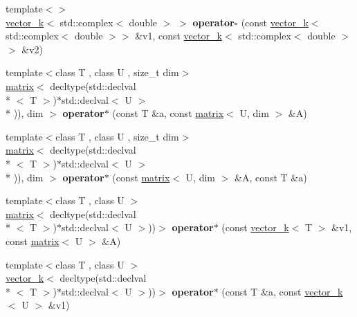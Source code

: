 \begin{DoxyCompactItemize}
\item 
\hypertarget{namespacekeycpp_a95c0f9757ba86c696c6c5bfa874c8a49}{{\footnotesize template$<$$>$ }\\\hyperlink{classkeycpp_1_1vector__k}{vector\-\_\-k}$<$ std\-::complex$<$ double $>$ $>$ {\bfseries operator-\/} (const \hyperlink{classkeycpp_1_1vector__k}{vector\-\_\-k}$<$ std\-::complex$<$ double $>$$>$ \&v1, const \hyperlink{classkeycpp_1_1vector__k}{vector\-\_\-k}$<$ std\-::complex$<$ double $>$$>$ \&v2)}\label{namespacekeycpp_a95c0f9757ba86c696c6c5bfa874c8a49}

\item 
\hypertarget{namespacekeycpp_a0fb730e3fdb0eb44a13913518ce0afc1}{{\footnotesize template$<$class T , class U , size\-\_\-t dim$>$ }\\\hyperlink{classkeycpp_1_1matrix}{matrix}$<$ decltype(std\-::declval\\*
$<$ T $>$)$\ast$std\-::declval$<$ U $>$\\*
)), dim $>$ {\bfseries operator$\ast$} (const T \&a, const \hyperlink{classkeycpp_1_1matrix}{matrix}$<$ U, dim $>$ \&A)}\label{namespacekeycpp_a0fb730e3fdb0eb44a13913518ce0afc1}

\item 
\hypertarget{namespacekeycpp_a650b89b71e7516e560bb2be49b30aedd}{{\footnotesize template$<$class T , class U , size\-\_\-t dim$>$ }\\\hyperlink{classkeycpp_1_1matrix}{matrix}$<$ decltype(std\-::declval\\*
$<$ T $>$)$\ast$std\-::declval$<$ U $>$\\*
)), dim $>$ {\bfseries operator$\ast$} (const \hyperlink{classkeycpp_1_1matrix}{matrix}$<$ U, dim $>$ \&A, const T \&a)}\label{namespacekeycpp_a650b89b71e7516e560bb2be49b30aedd}

\item 
\hypertarget{namespacekeycpp_a7a43db361f4a3128d89ad6a1db86686c}{{\footnotesize template$<$class T , class U $>$ }\\\hyperlink{classkeycpp_1_1matrix}{matrix}$<$ decltype(std\-::declval\\*
$<$ T $>$)$\ast$std\-::declval$<$ U $>$))$>$ {\bfseries operator$\ast$} (const \hyperlink{classkeycpp_1_1vector__k}{vector\-\_\-k}$<$ T $>$ \&v1, const \hyperlink{classkeycpp_1_1matrix}{matrix}$<$ U $>$ \&A)}\label{namespacekeycpp_a7a43db361f4a3128d89ad6a1db86686c}

\item 
\hypertarget{namespacekeycpp_a6e4d2d791a5cbcbcf90de5da2250b4c8}{{\footnotesize template$<$class T , class U $>$ }\\\hyperlink{classkeycpp_1_1vector__k}{vector\-\_\-k}$<$ decltype(std\-::declval\\*
$<$ T $>$)$\ast$std\-::declval$<$ U $>$))$>$ {\bfseries operator$\ast$} (const T \&a, const \hyperlink{classkeycpp_1_1vector__k}{vector\-\_\-k}$<$ U $>$ \&v1)}\label{namespacekeycpp_a6e4d2d791a5cbcbcf90de5da2250b4c8}


\end{DoxyCompactItemize}

